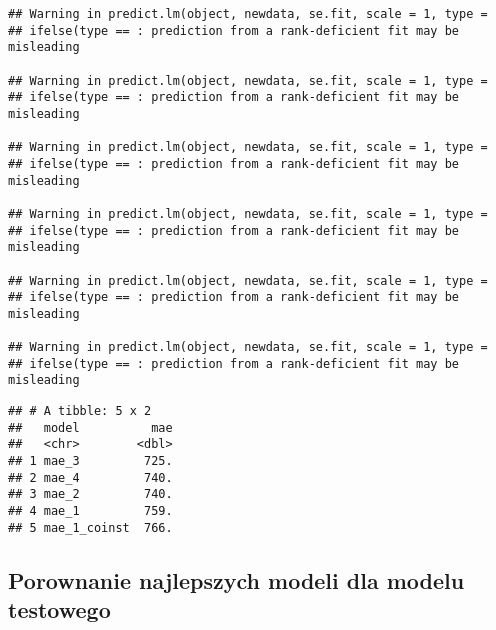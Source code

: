 \documentclass[]{article}
\begin{document}
\begin{verbatim}
## Warning in predict.lm(object, newdata, se.fit, scale = 1, type =
## ifelse(type == : prediction from a rank-deficient fit may be misleading

## Warning in predict.lm(object, newdata, se.fit, scale = 1, type =
## ifelse(type == : prediction from a rank-deficient fit may be misleading

## Warning in predict.lm(object, newdata, se.fit, scale = 1, type =
## ifelse(type == : prediction from a rank-deficient fit may be misleading

## Warning in predict.lm(object, newdata, se.fit, scale = 1, type =
## ifelse(type == : prediction from a rank-deficient fit may be misleading

## Warning in predict.lm(object, newdata, se.fit, scale = 1, type =
## ifelse(type == : prediction from a rank-deficient fit may be misleading

## Warning in predict.lm(object, newdata, se.fit, scale = 1, type =
## ifelse(type == : prediction from a rank-deficient fit may be misleading
\end{verbatim}

\begin{verbatim}
## # A tibble: 5 x 2
##   model          mae
##   <chr>        <dbl>
## 1 mae_3         725.
## 2 mae_4         740.
## 3 mae_2         740.
## 4 mae_1         759.
## 5 mae_1_coinst  766.
\end{verbatim}

\hypertarget{porownanie-najlepszych-modeli-dla-modelu-testowego-1}{%
\subsection{Porownanie najlepszych modeli dla modelu
testowego}\label{porownanie-najlepszych-modeli-dla-modelu-testowego-1}}
\end{document}
